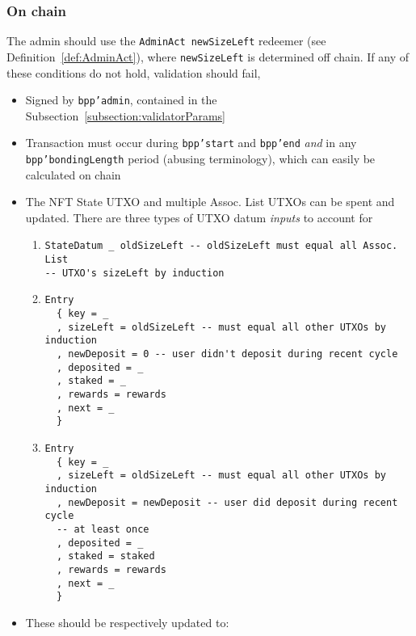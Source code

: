 \documentclass[10pt, a4paper]{article}
\theoremstyle{definition}
\begin{document}
\subsubsection{On chain}
The admin should use the \texttt{AdminAct newSizeLeft} redeemer (see Definition~\ref{def:AdminAct}), where \texttt{newSizeLeft} is determined off chain. If any of these conditions do not hold, validation should fail,
\begin{itemize}
\item{Signed by \texttt{bpp'admin}, contained in the Subsection~\ref{subsection:validatorParams}}
\item{Transaction must occur during \texttt{bpp'start} and \texttt{bpp'end} \textit{and} in any \texttt{bpp'bondingLength} period (abusing terminology), which can easily be calculated on chain}
\item{The NFT State UTXO and multiple Assoc. List UTXOs can be spent and updated. There are three types of UTXO datum \textit{inputs} to account for
\begin{enumerate}
\item{\begin{verbatim}
StateDatum _ oldSizeLeft -- oldSizeLeft must equal all Assoc. List
-- UTXO's sizeLeft by induction
\end{verbatim}
}
\item{
\begin{verbatim}
Entry
  { key = _
  , sizeLeft = oldSizeLeft -- must equal all other UTXOs by induction
  , newDeposit = 0 -- user didn't deposit during recent cycle
  , deposited = _
  , staked = _
  , rewards = rewards
  , next = _
  }  
\end{verbatim}
}
\item{
\begin{verbatim}
Entry
  { key = _
  , sizeLeft = oldSizeLeft -- must equal all other UTXOs by induction
  , newDeposit = newDeposit -- user did deposit during recent cycle
  -- at least once
  , deposited = _
  , staked = staked
  , rewards = rewards
  , next = _
  }  
\end{verbatim}
}
\end{enumerate}

}

\item{These should be respectively updated to:

}
\end{itemize}
\end{document}
